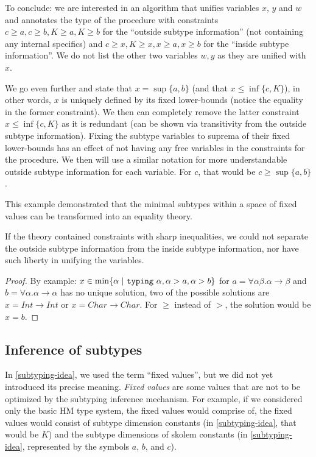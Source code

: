 To conclude: we are interested in an algorithm that unifies variables $x$, $y$ and $w$ and annotates the type of the procedure with constraints $c \geq a, c \geq b, K \geq a, K \geq b$ for the ``outside subtype information'' (not containing any internal specifics) and $c \geq x, K \geq x, x \geq a, x \geq b$ for the ``inside subtype information''. We do not list the other two variables $w, y$ as they are unified with $x$.

We go even further and state that $x = \sup \{a, b\}$ (and that $x \leq \inf \{c, K\}$), in other words, $x$ is uniquely defined by its fixed lower-bounds (notice the equality in the former constraint). We then can completely remove the latter constraint $x \leq \inf \{c, K\}$ as it is redundant (can be shown via transitivity from the outside subtype information). Fixing the subtype variables to suprema of their fixed lower-bounds has an effect of not having any free variables in the constraints for the procedure. We then will use a similar notation for more understandable outside subtype information for each variable. For $c$, that would be $c \geq \sup \{a, b\}$.

This example demonstrated that the minimal subtypes within a space of fixed values can be transformed into an equality theory.

\begin{observe}
    If the theory contained constraints with sharp inequalities, we could not separate the outside subtype information from the inside subtype information, nor have such liberty in unifying the variables.

    \begin{proof}
        By example: $x \in \min \{ \alpha \ |\  \mathtt{typing}\ \alpha, \alpha > a, \alpha > b \}$ for $a = \forall \alpha \beta . \alpha \to \beta$ and $b = \forall \alpha . \alpha \to \alpha$ has no unique solution, two of the possible solutions are $x = Int \to Int$ or $x = Char \to Char$. For $\geq$ instead of $>$, the solution would be $x = b$.
    \end{proof}
\end{observe}

\subsection{Inference of subtypes}
\label{sec:inferSub}

In \cref{subtyping-idea}, we used the term ``fixed values'', but we did not yet introduced its precise meaning. \emph{Fixed values} are some values that are not to be optimized by the subtyping inference mechanism. For example, if we considered only the basic HM type system, the fixed values would comprise of, the fixed values would consist of subtype dimension constants (in \cref{subtyping-idea}, that would be $K$) and the subtype dimensions of skolem constants (in \cref{subtyping-idea}, represented by the symbols $a$, $b$, and $c$).

